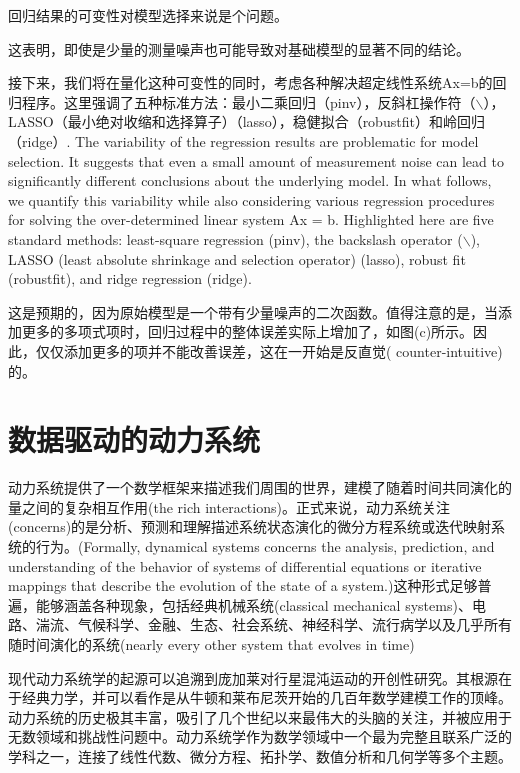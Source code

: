 \documentclass{ctexart}
\begin{document}

回归结果的可变性对模型选择来说是个问题。

这表明，即使是少量的测量噪声也可能导致对基础模型的显著不同的结论。

接下来，我们将在量化这种可变性的同时，考虑各种解决超定线性系统Ax=b的回归程序。这里强调了五种标准方法：最小二乘回归（pinv），反斜杠操作符（$\backslash$），LASSO（最小绝对收缩和选择算子）（lasso），稳健拟合（robustfit）和岭回归（ridge）.
The variability of the regression results are problematic for model selection. It suggests that even a small amount of measurement noise can lead to significantly different conclusions about the underlying model. In what follows, we quantify this variability while also considering various regression procedures for solving the over-determined linear system Ax = b. Highlighted here are five standard methods: least-square regression (pinv), the backslash operator ($\backslash$), LASSO (least absolute shrinkage and selection operator) (lasso), robust fit (robustfit), and ridge regression (ridge).

这是预期的，因为原始模型是一个带有少量噪声的二次函数。值得注意的是，当添加更多的多项式项时，回归过程中的整体误差实际上增加了，如图(c)所示。因此，仅仅添加更多的项并不能改善误差，这在一开始是反直觉( counter-intuitive)的。


\section{数据驱动的动力系统}

动力系统提供了一个数学框架来描述我们周围的世界，建模了随着时间共同演化的量之间的复杂相互作用(the rich interactions)。正式来说，动力系统关注(concerns)的是分析、预测和理解描述系统状态演化的{\color{red}微分方程系统}或{\color{blue}迭代映射系统}的行为。(Formally, dynamical systems concerns the analysis, prediction, and understanding of the behavior of systems of differential equations or iterative mappings that describe the evolution of the state of a
system.)这种形式足够普遍，能够涵盖各种现象，包括经典机械系统(classical mechanical systems)、电路、湍流、气候科学、金融、生态、社会系统、神经科学、流行病学以及几乎所有随时间演化的系统(nearly every other system that evolves in time)


现代动力系统学的起源可以追溯到庞加莱对行星混沌运动的开创性研究。其根源在于经典力学，并可以看作是从牛顿和莱布尼茨开始的几百年数学建模工作的顶峰。动力系统的历史极其丰富，吸引了几个世纪以来最伟大的头脑的关注，并被应用于无数领域和挑战性问题中。动力系统学作为数学领域中一个最为完整且联系广泛的学科之一，连接了线性代数、微分方程、拓扑学、数值分析和几何学等多个主题。
\end{document}
